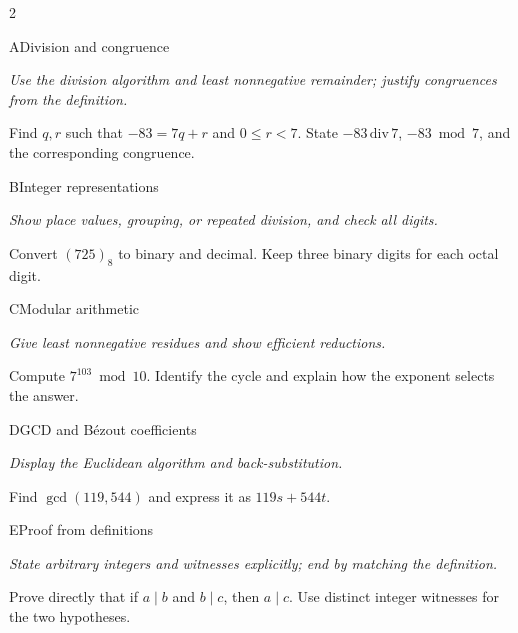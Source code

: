 \documentclass[9pt]{extarticle}
\begin{document}
\begin{multicols}{2}
\begin{CoreProblem}{A}{Division and congruence}
{\scriptsize\textit{Use the division algorithm and least nonnegative remainder; justify congruences from the definition.}\par}
Find $q,r$ such that $-83=7q+r$ and $0\le r<7$. State
$-83\,\mathrm{div}\,7$, $-83\bmod7$, and the corresponding congruence.
\end{CoreProblem}
\begin{CoreProblem}{B}{Integer representations}
{\scriptsize\textit{Show place values, grouping, or repeated division, and check all digits.}\par}
Convert $(725)_8$ to binary and decimal. Keep three binary digits for each
octal digit.
\end{CoreProblem}
\begin{CoreProblem}{C}{Modular arithmetic}
{\scriptsize\textit{Give least nonnegative residues and show efficient reductions.}\par}
Compute $7^{103}\bmod10$. Identify the cycle and explain how the exponent
selects the answer.
\end{CoreProblem}
\columnbreak
\begin{CoreProblem}{D}{GCD and B\'ezout coefficients}
{\scriptsize\textit{Display the Euclidean algorithm and back-substitution.}\par}
Find $\gcd(119,544)$ and express it as $119s+544t$.
\end{CoreProblem}
\begin{CoreProblem}{E}{Proof from definitions}
{\scriptsize\textit{State arbitrary integers and witnesses explicitly; end by matching the definition.}\par}
Prove directly that if $a\mid b$ and $b\mid c$, then $a\mid c$. Use distinct
integer witnesses for the two hypotheses.
\end{CoreProblem}
\end{multicols}
\CoreWorkArea
\FormBreak
{}
\end{document}

